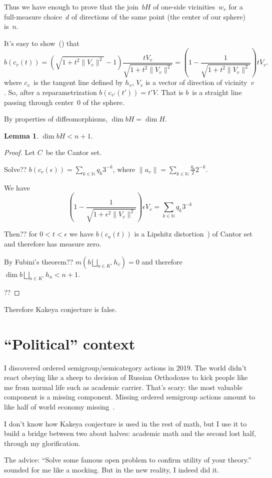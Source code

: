 \documentclass[oneside,draft]{amsart}
\newcommand{\norm}[1]{\lVert #1\rVert}
\newtheorem{lem}{Lemma}
\begin{document}
Thus we have enough to prove that the join~$bH$ of one-si\-de vicinities~$w_v$ for a full-me\-a\-su\-re choice~$d$ of directions of the same point (the center of our sphere) is~$n$. 

It's easy to show~(\cite{curve}) that
\[ b(c_v(t)) = \left(\sqrt{1+t^2\norm{V_v}^2}-1\right)\frac{tV_v}{\sqrt{1+t^2\norm{V_v}^2}} =
\left(1-\frac{1}{\sqrt{1+t^2\norm{V_v}^2}}\right)tV_v. \]
where $c_v$~is the tangent line defined by $h_v$, $V_v$ is a vector of direction of vicinity~$v$.
So, after a reparametrization $b(c_{v'}(t')) = t'V$.
That is $b$~is a straight line passing through center~$0$ of the sphere.

By properties of diffeomorphisms, $\dim bH = \dim H$.

\begin{lem}
$\dim bH<n+1$.
\end{lem}

\begin{proof}
Let $C$~be the Cantor set.

Solve?? $b(c_v(\epsilon)) = \sum_{k\in\mathbb{N}}q_k 3^{-k}$, where $\norm{a_v} = \sum_{k\in\mathbb{N}}\frac{q_k}{2} 2^{-k}$.

We have
\[ \left(1-\frac{1}{\sqrt{1+\epsilon ^2\norm{V_v}^2}}\right)\epsilon V_v = \sum_{k\in\mathbb{N}}q_k 3^{-k} \]

Then?? for $0<t<\epsilon$ we have $b(c_a(t))$ is a Lipshitz distortion~\cite{Cantor-distort}) of Cantor set and therefore has measure zero.

By Fubini's theorem?? $m(b\bigsqcup_{a\in K'}h_v) = 0$ and therefore $\dim b\bigsqcup_{a\in K'}h_a<n+1$.

??
\end{proof}


Therefore Kakeya conjecture is false.

\section{``Political'' context}

I discovered ordered semigroup/semicategory actions in 2019. The world didn't react obeying like a sheep to decision of Russian Orthodoxes to kick people like me from normal life such as academic carrier. That's scary: the most valuable component is a missing component. Missing ordered semigroup actions amount to like half of world economy missing~\cite{osa-important}.

I don't know how Kakeya conjecture is used in the rest of math, but I use it to build a bridge between two about halves: academic math and the second lost half, through my glorification.

The advice: ``Solve some famous open problem to confirm utility of your theory.'' sounded for me like a mocking. But in the new reality, I indeed did it.



\end{document}
